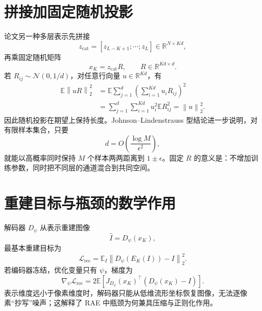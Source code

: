 \documentclass[UTF8,12pt,a4paper,fontset=none]{ctexart}
\numberwithin{equation}{section}
\newcommand{\R}{\mathbb{R}}
\newcommand{\E}{\mathbb{E}}
\newcommand{\Loss}{\mathcal{L}}
\newcommand{\norm}[1]{\left\lVert #1\right\rVert}
\begin{document}
\section{拼接加固定随机投影}
论文另一种多层表示先拼接
\begin{equation}
 z_{\mathrm{cat}}=[z_{L-K+1};\cdots;z_L]\in\R^{N\times Kd},
\end{equation}
再乘固定随机矩阵
\begin{equation}
 \boxed{x_K=z_{\mathrm{cat}}R,\qquad R\in\R^{Kd\times d}.}
\end{equation}
若 $R_{ij}\sim\mathcal N(0,1/d)$，对任意行向量 $u\in\R^{Kd}$，有
\begin{align}
 \E\norm{uR}_2^2
 &=\E\sum_{j=1}^{d}\left(\sum_{i=1}^{Kd}u_iR_{ij}\right)^2\\
 &=\sum_{j=1}^{d}\sum_{i=1}^{Kd}u_i^2\E R_{ij}^2
 =\norm{u}_2^2.
\end{align}
因此随机投影在期望上保持长度。Johnson--Lindenstrauss 型结论进一步说明，对有限样本集合，只要
\begin{equation}
 d=O\!\left(\frac{\log M}{\epsilon^2}\right),
\end{equation}
就能以高概率同时保持 $M$ 个样本两两距离到 $1\pm\epsilon$。固定 $R$ 的意义是：不增加训练参数，同时把不同层的通道混合到共同空间。

\section{重建目标与瓶颈的数学作用}
解码器 $D_\psi$ 从表示重建图像
\begin{equation}
 \widehat I=D_\psi(x_K),
\end{equation}
最基本重建目标为
\begin{equation}
 \Loss_{\mathrm{rec}}=\E_I\norm{D_\psi(E_K(I))-I}_2^2.
\end{equation}
若编码器冻结，优化变量只有 $\psi$，梯度为
\begin{equation}
 \nabla_\psi\Loss_{\mathrm{rec}}
 =2\E\left[J_{D_\psi}(x_K)^\top(D_\psi(x_K)-I)\right].
\end{equation}
表示维度远小于像素维度时，解码器只能从低维流形坐标恢复图像，无法逐像素“抄写”噪声；这解释了 RAE 中瓶颈为何兼具压缩与正则化作用。
\end{document}
